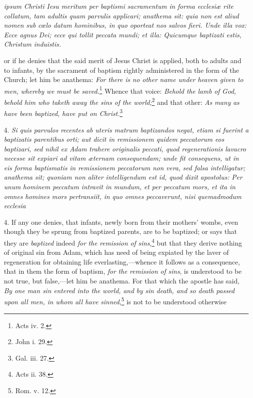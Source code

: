 \emph{ipsum Christi Iesu meritum per baptismi sacramentum in forma ecclesiæ rite collatum, tam adultis quam parvulis applicari; anathema sit: quia non est aliud nomen sub cœlo datum hominibus, in quo oporteat nos salvos fieri. Unde illa vox: Ecce agnus Dei; ecce qui tollit peccata mundi; et illa: Quicumque baptizati estis, Christum induistis.}

or if he denies that the said merit of Jesus Christ is applied, both to adults and to infants, by the sacrament of baptism rightly administered in the form of the Church; let him be anathema: \emph{For there is no other name under heaven given to men, whereby we must be saved.}\footnote{\par   Acts iv. 2.} Whence that voice: \emph{Behold the lamb of God, behold him who taketh away the sins of the world;}\footnote{\par   John i. 29.} and that other: \emph{As many as have been baptized, have put on Christ.}\footnote{\par   Gal. iii. 27.}

4. \emph{Si quis parvulos recentes ab uteris matrum baptizandos negat, etiam si fuerint a baptizatis parentibus orti; aut dicit in remissionem quidem peccatorum eos baptizari, sed nihil ex Adam trahere originalis peccati, quod regenerationis lavacro necesse sit expiari ad vitam æternam consequendam; unde fit consequens, ut in eis forma baptismatis in remissionem peccatorum non vera, sed falsa intelligatur; anathema sit; quoniam non aliter intelligendum est id, quod dixit apostolus: Per unum hominem peccatum intravit in mundum, et per peccatum mors, et ita in omnes homines mors pertransiit, in quo omnes peccaverunt, nisi quemadmodum ecclesia }

4. If any one denies, that infants, newly born from their mothers' wombs, even though they be sprung from baptized parents, are to be baptized; or says that they are \emph{baptized} indeed \emph{for the remission of sins},\footnote{\par   Acts ii. 38.} but that they derive nothing of original sin from Adam, which has need of being expiated by the laver of regeneration for obtaining life everlasting,—whence it follows as a consequence, that in them the form of baptism, \emph{for the remission of sins}, is understood to be not true, but false,—let him be anathema. For that which the apostle has said, \emph{By one man sin entered into the world, and by sin death, and so death passed upon all men, in whom all have sinned},\footnote{\par   Rom. v. 12.} is not to be understood otherwise

